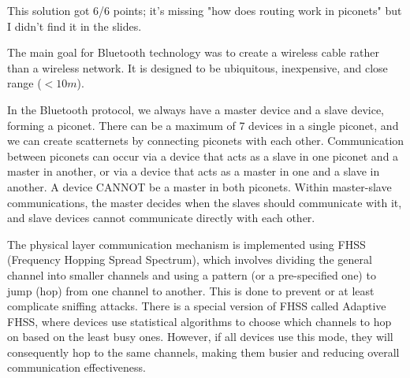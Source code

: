 \begin{questions}




    \begin{solution}
        This solution got 6/6 points; it's missing "how does routing work in piconets" but I didn't find it in the slides.

        The main goal for Bluetooth technology was to create a wireless cable rather than a wireless network. It is designed to be ubiquitous, inexpensive, and close range ($<10m$).

        In the Bluetooth protocol, we always have a master device and a slave device, forming a piconet. There can be a maximum of 7 devices in a single piconet, and we can create scatternets by connecting piconets with each other. Communication between piconets can occur via a device that acts as a slave in one piconet and a master in another, or via a device that acts as a master in one and a slave in another. A device CANNOT be a master in both piconets. Within master-slave communications, the master decides when the slaves should communicate with it, and slave devices cannot communicate directly with each other.

        The physical layer communication mechanism is implemented using FHSS (Frequency Hopping Spread Spectrum), which involves dividing the general channel into smaller channels and using a pattern (or a pre-specified one) to jump (hop) from one channel to another. This is done to prevent or at least complicate sniffing attacks. There is a special version of FHSS called Adaptive FHSS, where devices use statistical algorithms to choose which channels to hop on based on the least busy ones. However, if all devices use this mode, they will consequently hop to the same channels, making them busier and reducing overall communication effectiveness.


\end{solution}
\end{questions}
